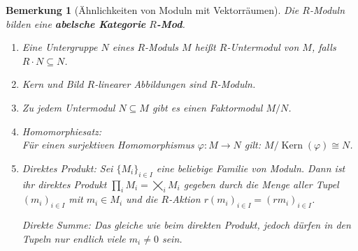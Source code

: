 \documentclass[a4paper,12pt]{scrbook}
\theoremstyle{break}
\newtheorem{Bem}[Def]{Bemerkung}
\theoremstyle{nonumberbreak}
\theoremstyle{nonumberplain}
\newcommand{\emp}[1]{\textbf{\emph{#1}}}
\DeclareMathOperator{\Kern}{Kern}
\begin{document}
\begin{Bem}[Ähnlichkeiten von Moduln mit Vektorräumen]
  Die $R$-Moduln bilden eine \emp{abelsche Kategorie} \emp{$R$-Mod}.
  \begin{enumerate}
    \item Eine Untergruppe $N$ eines $R$-Moduls $M$ heißt $R$-Untermodul von
          $M$, falls $R \cdot N \subseteq N$.
    \item Kern und Bild $R$-linearer Abbildungen sind $R$-Moduln.
    \item Zu jedem Untermodul $N \subseteq M$ gibt es einen Faktormodul $M/N$.
    \item Homomorphiesatz:\\
      Für einen surjektiven Homomorphismus $\varphi: M \rightarrow N$ gilt:
      $M/\Kern(\varphi) \cong N$.
    \item \emph{Direktes Produkt}: Sei ${\{M_{i}\}}_{i \in I}$ eine beliebige
          Familie von Moduln. Dann ist ihr direktes Produkt
     	  $\prod_i M_i = \bigtimes_i M_i$ gegeben durch die Menge aller Tupel ${(m_i)}_{i
     	  \in I}$ mit $m_i \in M_i$ und die $R$-Aktion ${r(m_i)}_{i \in I} = {(rm_i)}_{i \in I}$.

	  \emph{Direkte Summe}: Das gleiche wie beim direkten Produkt, jedoch dürfen in den 
	  Tupeln nur endlich viele $m_i \neq 0$ sein.
  \end{enumerate}
\end{Bem}
\end{document}

